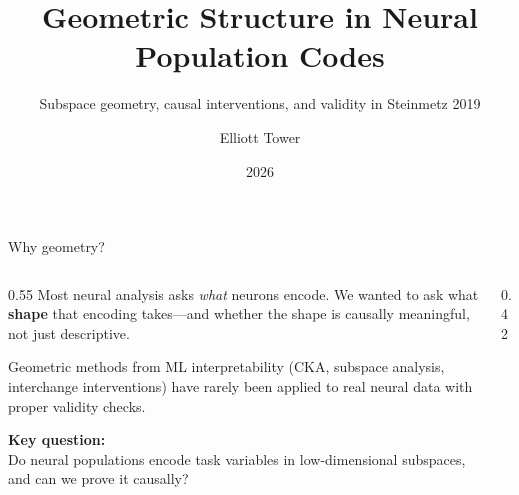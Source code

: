 \documentclass[aspectratio=169,11pt]{beamer}
\title{Geometric Structure in Neural Population Codes}
\subtitle{Subspace geometry, causal interventions, and validity in Steinmetz 2019}
\author{Elliott Tower}
\date{2026}
\institute{}
\begin{document}
\maketitle


\begin{frame}{Why geometry?}
\begin{columns}[T]
\begin{column}{0.55\textwidth}
Most neural analysis asks \emph{what} neurons encode. We wanted to ask what \textbf{shape} that encoding takes---and whether the shape is causally meaningful, not just descriptive.

Geometric methods from ML interpretability (CKA, subspace analysis, interchange interventions) have rarely been applied to real neural data with proper validity checks.

\vspace{1em}
\textbf{Key question:} \\
Do neural populations encode task variables in low-dimensional subspaces, and can we prove it causally?
\end{column}
\begin{column}{0.42\textwidth}
\end{column}
\end{columns}
\end{frame}
\end{document}

